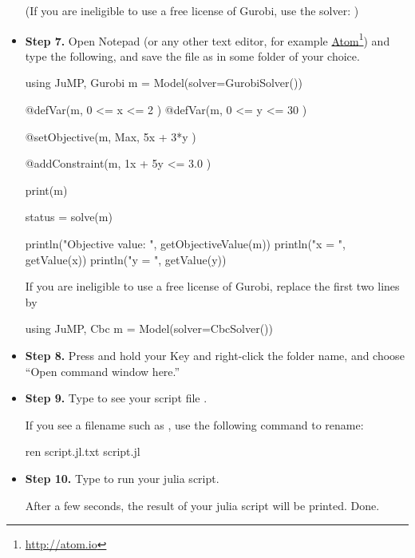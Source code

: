 \begin{itemize}
(If you are ineligible to use a free license of Gurobi, use the  solver: )


\item \textbf{Step 7.} Open Notepad (or any other text editor, for example \href{http://atom.io}{Atom}\footnote{\url{http://atom.io}}) and type the following, and save the file as  in some folder of your choice.
\begin{code}
using JuMP, Gurobi
m = Model(solver=GurobiSolver())

@defVar(m, 0 <= x <= 2 )
@defVar(m, 0 <= y <= 30 )

@setObjective(m, Max, 5x + 3*y )

@addConstraint(m, 1x + 5y <= 3.0 )

print(m)

status = solve(m)

println("Objective value: ", getObjectiveValue(m))
println("x = ", getValue(x))
println("y = ", getValue(y))
\end{code}

If you are ineligible to use a free license of Gurobi, replace the first two lines by
\begin{code}
using JuMP, Cbc
m = Model(solver=CbcSolver())
\end{code}



\item \textbf{Step 8.} Press and hold your  Key and right-click the folder name, and choose ``Open command window here.''



\item \textbf{Step 9.} Type  to see your script file .


If you see a filename such as , use the following command to rename:
\begin{code}
ren script.jl.txt script.jl
\end{code}

\item \textbf{Step 10.} Type  to run your julia script.


After a few seconds, the result of your julia script will be printed. Done.

\end{itemize}

